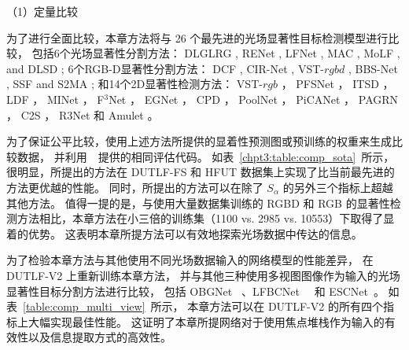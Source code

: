 （1）定量比较

为了进行全面比较，本章方法将与 26 个最先进的光场显著性目标检测模型进行比较，
包括6个光场显著性分割方法：
DLGLRG \cite{liu2021light}, RENet \cite{piao2020exploit}, LFNet \cite{zhang2020lfnet},
MAC \cite{zhang2020light}, MoLF \cite{zhang2019memory}, and DLSD \cite{piao2019deep};
%
%
%
%
6个RGB-D显著性分割方法：
DCF \cite{ji2021calibrated}, CIR-Net \cite{cong2022cir}, VST-$rgbd$  \cite{liu2021visual},
BBS-Net     \cite{fan2020bbs}, SSF     \cite{zhang2020select} and S2MA    \cite{liu2020learning};
%
%
%
%
%
和14个2D显著性检测方法：
VST-$rgb$ \cite{liu2021visual}，
PFSNet \cite{ma2021pyramidal}，
ITSD \cite{zhou2020interactive}，
LDF \cite{wei2020label}，
MINet \cite{pang2020multi}，
F$^{3}$Net  \cite{wei2020f3net}， 
EGNet   \cite{zhao2019egnet}，
CPD  \cite{wu2019cascaded}，
PoolNet \cite{liu2019simple}，
PiCANet \cite{liu2018picanet}，
PAGRN \cite{wang2018detect}，
C2S   \cite{li2018contour}，
R3Net  \cite{deng2018r3net}
和
Amulet \cite{zhang2017amulet}。






为了保证公平比较，使用上述方法所提供的显着性预测图或预训练的权重来生成比较数据，
并利用~\cite{liu2021visual}~提供的相同评估代码。
如表~\ref{chpt3:table:comp_sota}~所示，
很明显，所提出的方法在 DUTLF-FS 和 HFUT 数据集上实现了比当前最先进的方法更优越的性能。 同时，所提出的方法可以在除了 $ S_{\alpha} $ 的另外三个指标上超越其他方法。 值得一提的是，与使用大量数据集训练的 RGBD 和 RGB 的显著性检测方法相比，本章方法在小三倍的训练集（1100 vs. 2985 vs. 10553）下取得了显着的优势。 
这表明本章所提方法可以有效地探索光场数据中传达的信息。 



为了检验本章方法与其他使用不同光场数据输入的网络模型的性能差异，
在 DUTLF-V2 上重新训练本章方法，
并与其他三种使用多视图图像作为输入的光场显著性目标分割方法进行比较，
包括 OBGNet ~\cite{jing2021occlusion}、LFBCNet~\cite{wang2022lfbcnet}~ 和 ESCNet~\cite{zhang2022exploring}。 如表~\ref{table:comp_multi_view}~所示，
本章方法可以在 DUTLF-V2 的所有四个指标上大幅实现最佳性能。 
这证明了本章所提网络对于使用焦点堆栈作为输入的有效性以及信息提取方式的高效性。 



